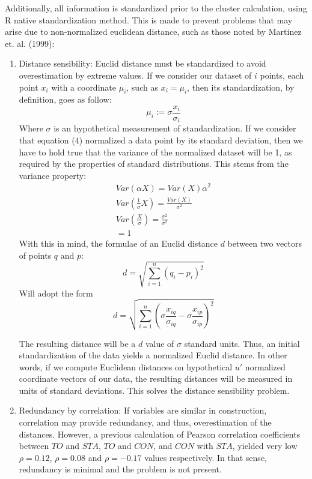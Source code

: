 \documentclass[12pt,a4paper]{article}
\begin{document}
Additionally, all information is standardized prior to the cluster calculation, using R native standardization method. This is made to prevent problems that may arise due to non-normalized euclidean distance, such as those noted by Martinez et. al. (1999):
\begin{enumerate}
	\item Distance sensibility: Euclid distance must be standardized to avoid overestimation by extreme values. If we consider our dataset of $i$ points, each point $x_{i}$ with a coordinate $\mu_{i}$, such as $x_{i} = \mu_{i}$, then its standardization, by definition, goes as follow:
	\begin{equation}
		\mu_{i} := \sigma \frac{x_{i}}{\sigma_{i}}
	\end{equation}
	Where $\sigma$ is an hypothetical measurement of standardization. If we consider that equation (4) normalized a data point by its standard deviation, then we have to hold true that the variance of the normalized dataset will be 1, as required by the properties of standard distributions. This stems from the variance property:
	\begin{equation}
	\begin{split}
		Var(\alpha X) = Var(X)\alpha^2 \\
		Var(\frac{1}{\sigma} X) = \frac{Var(X)}{\sigma^2} \\
	    Var(\frac{X}{\sigma}) = \frac{\sigma^2}{\sigma^2} \\
	    = 1
	\end{split}
	\end{equation}
	With this in mind, the formulae of an Euclid distance $d$ between two vectors of points $q$ and $p$:
	\begin{equation}
		d = \sqrt{\sum_{i = 1}^{n}(q_{i}-p_{i})^2}
	\end{equation}
	Will adopt the form
	\begin{equation}
		d = \sqrt{\sum_{i = 1}^{n}(\sigma \frac{x_{iq}}{\sigma_{iq}} - \sigma \frac{x_{ip}}{\sigma_{ip} })^2}
	\end{equation}

	The resulting distance will be a $d$ value of $\sigma$ standard units. Thus, an initial standardization of the data yields a normalized Euclid distance. In other words, if we compute Euclidean distances on hypothetical $u'$ normalized coordinate vectors of our data, the resulting distances will be measured in units of standard deviations. This solves the distance sensibility problem.
	
	\item Redundancy by correlation: If variables are similar in construction, correlation may provide redundancy, and thus, overestimation of the distances. However, a previous calculation of Pearson correlation coefficients between $TO$ and $STA$, $TO$ and $CON$, and $CON$ with $STA$, yielded very low $\rho = 0.12$, $\rho = 0.08$ and $\rho = -0.17$ values respectively. In that sense, redundancy is minimal and the problem is not present.
\end{enumerate}
\end{document}
